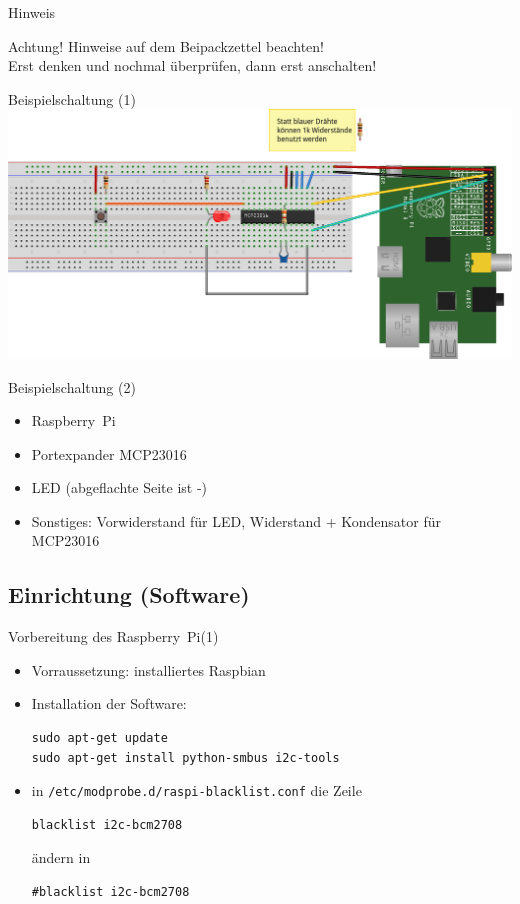 \documentclass{beamer}
\newcommand{\RPi}{Raspberry~Pi\xspace}
\begin{document}
\begin{frame}{Hinweis}
 \begin{alertblock}{Achtung!}
  Hinweise auf dem Beipackzettel beachten!\\
  Erst denken und nochmal überprüfen, dann erst anschalten!
 \end{alertblock}
\end{frame}

\begin{frame}{Beispielschaltung (1)}
 \includegraphics[width=\textwidth]{testaufbau.png}
\end{frame}

\begin{frame}{Beispielschaltung (2)}
 \begin{itemize}
   \item \RPi
   \item Portexpander MCP23016
    
  \item LED (abgeflachte Seite ist -)
  \item Sonstiges: Vorwiderstand für LED, Widerstand + Kondensator für MCP23016
 \end{itemize}
\end{frame}



\subsection{Einrichtung (Software)}

\begin{frame}[fragile]{Vorbereitung des \RPi  (1)}
 \begin{itemize}
   \item Vorraussetzung: installiertes Raspbian
   \item Installation der Software:
    \lstset{language=bash}
    \begin{lstlisting}
sudo apt-get update
sudo apt-get install python-smbus i2c-tools
    \end{lstlisting}
  \item in \lstinline|/etc/modprobe.d/raspi-blacklist.conf| die Zeile
    \begin{lstlisting}
blacklist i2c-bcm2708
    \end{lstlisting} ändern in \begin{lstlisting}
#blacklist i2c-bcm2708
    \end{lstlisting}
 \end{itemize}
\end{frame}
 
\end{document}
